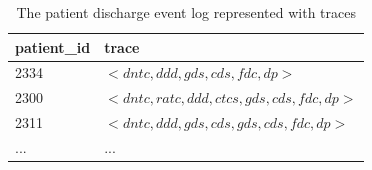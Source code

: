\footnotesize
\begin{longtable}{|l|l|}
    \caption[Event log with traces]{The patient discharge event log represented with traces}
    \label{table:eventlog_traces} \\
    
    \hline
         \textbf{patient\_id}    & \textbf{trace}                                 \\ \hline
         2334           & $< dntc,ddd,gds,cds,fdc,dp >$       \\ \hline
         2300           & $< dntc,ratc,ddd,ctcs,gds,cds,fdc,dp >$                       \\ \hline
         2311          & $< dntc,ddd,gds,cds,gds,cds,fdc,dp >$               \\ \hline
         ...          & ...             \\ \hline
\end{longtable}
\normalsize